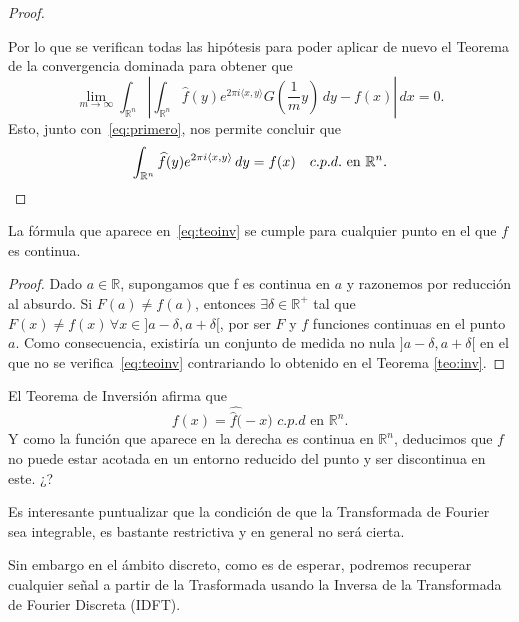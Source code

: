 \begin{proof}
\begin{itemize}
\end{itemize}
Por lo que se verifican todas las hipótesis para poder aplicar de nuevo el Teorema de la convergencia dominada para obtener que
\begin{equation}
    \lim_{m \to \infty}\int_{\mathbb{R}^n}\left|\int_{\mathbb{R}^n}\widehat{f}(y)e^{2\pi i \langle x, y \rangle}G\left(\frac{1}{m}y\right) \, dy - f(x)\right| \, dx = 0.
\end{equation}
Esto, junto con~\eqref{eq:primero}, nos permite concluir que 
\begin{equation*}
    \int_{\mathbb{R}^n}\widehat{f}(y)e^{2\pi i \langle x, y \rangle} \, dy =f(x) \quad c.p.d. \,\, \text{en}\,\, {\mathbb{R}^n}. \qedhere
\end{equation*}
    
\end{proof}


\begin{corolario}
    La fórmula que aparece en~\eqref{eq:teoinv}  se cumple para cualquier punto en el que $f$ es continua. 
\end{corolario}
\begin{proof}
    Dado $a \in \mathbb{R}$, supongamos que f es continua en $a$ y razonemos por reducción al absurdo.
    Si $F(a)\neq f(a)$, entonces $\exists \delta \in \mathbb{R^+}$ tal que $F(x)\neq f(x) \, \forall x \in ]a-\delta, a+\delta[$, por ser $F$ y $f$ funciones continuas en el punto $a$.
    Como consecuencia, existiría un conjunto de medida no nula $]a-\delta, a+\delta[$ en el que no se verifica~\eqref{eq:teoinv} contrariando lo obtenido en el Teorema \ref{teo:inv}.
\end{proof}


\begin{observacion}
   El Teorema de Inversión afirma que 
   \begin{equation}
       f(x) = \widehat{\widehat{f}(}-x )\,\, c.p.d \,\, \text{en} \,\, \mathbb{R}^n.
   \end{equation}
Y como la función que aparece en la derecha es continua en $\mathbb{R}^n$, deducimos que $f$ no puede estar acotada en un entorno reducido del punto y ser discontinua en este. ¿?
\end{observacion}

\noindent Es interesante puntualizar que la condición de que la Transformada de Fourier sea integrable, es bastante restrictiva y en general no será cierta.

\noindent Sin embargo en el ámbito discreto, como es de esperar, podremos recuperar cualquier señal a partir de la Trasformada usando la Inversa de la Transformada de Fourier Discreta (IDFT). 





